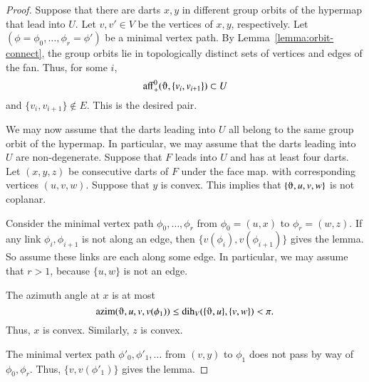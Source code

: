 \begin{proof} Suppose that there are darts $x,y$ in different group orbits
of the hypermap that lead into $U$.  Let $v,v'\in V$ be the vertices of $x,y$, respectively.
Let $(\phi=\phi_0,\ldots,\phi_r=\phi')$ be a minimal vertex path.
By Lemma~\ref{lemma:orbit-connect},  the group orbits
lie in topologically distinct sets of vertices and edges of the fan.   
Thus, for some $i$,
   $$
   \op{aff}_+^0(\orgn,\{v_i,v_{i+1}\})\subset U
   $$
and $\{v_i,v_{i+1}\}\not\in E$.  This is the desired pair.

We may now assume that the darts leading into $U$ all belong to the same
group orbit of the hypermap.  In particular, we may assume that
the darts leading into $U$ are non-degenerate.
Suppose that $F$ leads into $U$ and has at least four darts.
Let $(x,y,z)$ be consecutive darts of $F$ under the face map.  
with corresponding vertices $(u,v,w)$.  Suppose that $y$ is convex.
This implies that $\{\orgn,u,v,w\}$ is not coplanar.

Consider the minimal vertex path $\phi_0,\ldots,\phi_r$ from
$\phi_0=(u,x)$ to $\phi_r=(w,z)$.  
If any link $\phi_i,\phi_{i+1}$ is not along an edge,
then $\{v(\phi_i),v(\phi_{i+1})\}$ gives the lemma.
So assume these links are each along some edge.  In particular, we may
assume that $r>1$, because $\{u,w\}$ is not an edge.

The azimuth angle at $x$ is at most
   $$\op{azim}(\orgn,u,v,v(\phi_1))\le 
     \dih_V(\{\orgn,u\},\{v,w\}) <\pi.$$
Thus, $x$ is convex.  Similarly, $z$ is convex.  

The minimal vertex path $\phi'_0,\phi'_1,\ldots$
from $(v,y)$ to $\phi_1$ does not pass
by way of $\phi_0,\phi_r$.  Thus, $\{v,v(\phi'_1)\}$ gives the
lemma.
\end{proof}

%
%
%
%


